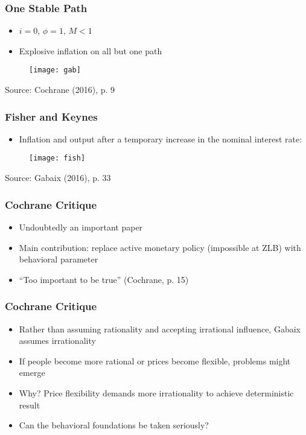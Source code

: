 \documentclass{beamer}
\begin{document}
 
 \begin{frame}
 	\frametitle{One Stable Path}
 	\begin{itemize}
 		\item $i = 0$, $\phi = 1$, $M < 1$
 		\item Explosive inflation on all but one path
 	\end{itemize}
 	\begin{figure}[h]
 		\texttt{[image: gab]}
 	\end{figure}
 	{\footnotesize Source: Cochrane (2016), p. 9}
 \end{frame}
 
 
\begin{frame}
	\frametitle{Fisher and Keynes}
	\begin{itemize}
		\item Inflation and output after a temporary increase in the nominal interest rate:
	\end{itemize}
	\begin{figure}[h]
	\texttt{[image: fish]}
	\end{figure}
	{\footnotesize Source: Gabaix (2016), p. 33}
\end{frame}


\begin{frame}
	\frametitle{Cochrane Critique}
	\begin{itemize}
		\item Undoubtedly an important paper
		\item Main contribution: replace active monetary policy (impossible at ZLB) with behavioral parameter
		\item ``Too important to be true'' (Cochrane, p. 15)
	\end{itemize}
\end{frame}


\begin{frame}
	\frametitle{Cochrane Critique}
	\begin{itemize}
		\item Rather than assuming rationality and accepting irrational influence, Gabaix assumes irrationality 
		\item If people become more rational or prices become flexible, problems might emerge
		\item Why? Price flexibility demands more irrationality to achieve deterministic result
		\item Can the behavioral foundations be taken seriously?
	\end{itemize}
\end{frame}
\end{document}
